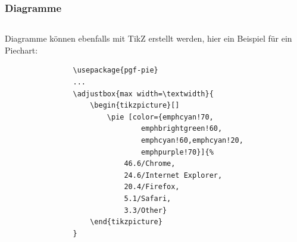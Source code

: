 \documentclass[german,notoc]{tudbeamer}%
\begin{document}
\begin{frame}[fragile]
	\frametitle{Diagramme}

	\begin{columns}[T,onlytextwidth]
		\begin{column}{.475\textwidth}
			Diagramme können ebenfalls mit TikZ erstellt werden, hier ein Beispiel für ein Piechart:
			\begin{lstlisting}[gobble=8,style=latex]
				 % in die Prämbel einfügen
				\usepackage{pgf-pie}
				...
				\adjustbox{max width=\textwidth}{
					\begin{tikzpicture}[]
						\pie [color={emphcyan!70, 
								emphbrightgreen!60,
								emphcyan!60,emphcyan!20,
								emphpurple!70}]{%
							46.6/Chrome,
							24.6/Internet Explorer,
							20.4/Firefox,
							5.1/Safari,
							3.3/Other}
					\end{tikzpicture}
				}
			\end{lstlisting} 
		\end{column}
		\begin{column}{.475\textwidth}
		\end{column}
	\end{columns}
\end{frame}
\end{document}
